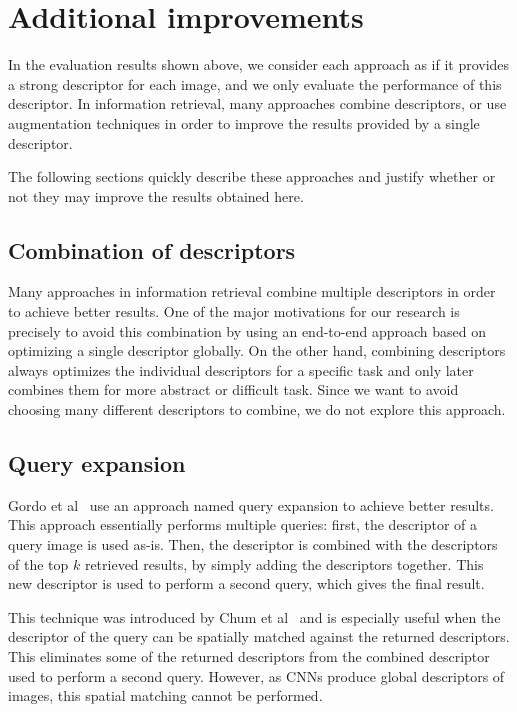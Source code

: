 \section{Additional improvements}
In the evaluation results shown above, we consider each approach
as if it provides a strong descriptor for each image, and we only
evaluate the performance of this descriptor.
In information retrieval, many approaches combine descriptors,
or use augmentation techniques in order to improve the results
provided by a single descriptor.

The following sections quickly describe these approaches and
justify whether or not they may improve the results obtained
here.

\subsection{Combination of descriptors}
Many approaches in information retrieval combine multiple
descriptors in order to achieve better results. One of the
major motivations for our research is precisely to avoid
this combination by using an end-to-end approach based
on optimizing a single descriptor globally. On the other hand,
combining descriptors always optimizes the individual descriptors
for a specific task and only later combines them for more
abstract or difficult task. Since we want to avoid choosing
many different descriptors to combine, we do not explore
this approach.

\subsection{Query expansion}
Gordo et al~\cite{gordo_end--end_2016} use an approach
named query expansion to achieve better results. This
approach essentially performs multiple queries: first, the
descriptor of a query image is used as-is. Then, the descriptor
is combined with the descriptors of the top $k$ retrieved
results, by simply adding the descriptors together. This new
descriptor is used to perform a second query, which gives
the final result.

This technique was introduced by
Chum et al~\cite{chum_total_2007} and is especially useful
when the descriptor of the query can be spatially matched
against the returned descriptors. This eliminates some of the
returned descriptors from the combined descriptor used
to perform a second query. However, as CNNs produce
global descriptors of images, this spatial matching cannot
be performed.

